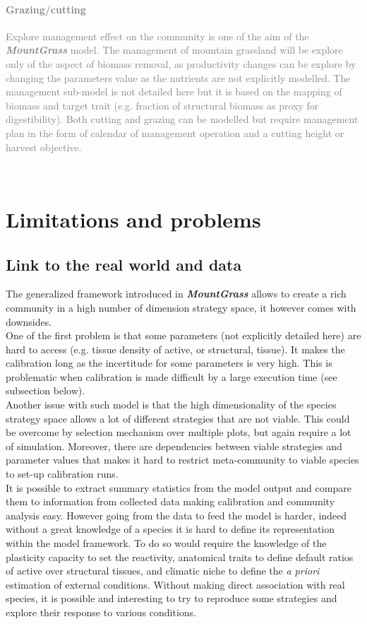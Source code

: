 \documentclass[a4paper,twoside, justified,marginals=raggedright, nobib]{tufte-handout}
\newcommand{\model}{\textit{\textbf{MountGrass }}}
\begin{document}
\textcolor{gray}{\paragraph{Grazing/cutting} Explore management effect on the community is one of the aim of the \model model. The management of mountain grassland will be explore only of the aspect of biomass removal, as productivity changes can be explore by changing the parameters value as the nutrients are not explicitly modelled. The management sub-model is not detailed here but it is based on the mapping of biomass and target trait (e.g. fraction of structural biomass as proxy for digestibility). Both cutting and grazing can be modelled but require management plan in the form of calendar of management operation and a cutting height or harvest objective.}\\

\section{Limitations and problems}

\subsection{Link to the real world and data}
The generalized framework introduced in \model allows to create a rich community in a high number of dimension strategy space, it however comes with downsides.\\
\indent One of the first problem is that some parameters (not explicitly detailed here) are hard to access (e.g. tissue density of active, or structural, tissue). It makes the calibration long as the incertitude for some parameters is very high. This is problematic when calibration is made difficult by a large execution time (see subsection below).\\
\indent Another issue with such model is that the high dimensionality of the species strategy space allows a lot of different strategies that are not viable. This could be overcome by selection mechanism over multiple plots, but again require a lot of simulation. Moreover, there are dependencies between viable strategies and parameter values that makes it hard to restrict meta-community to viable species to set-up calibration runs.\\
\indent It is possible to extract summary statistics from the model output and compare them to information from collected data making calibration and community analysis easy. However going from the data to feed the model is harder, indeed without a great knowledge of a species it is hard to define its representation within the model framework. To do so would require the knowledge of the plasticity capacity to set the reactivity, anatomical traits to define default ratios of active over structural tissues, and climatic niche to define the \textit{a priori} estimation of external conditions. Without making direct association with real species, it is possible and interesting to try to reproduce some strategies and explore their response to various conditions.
\end{document}
